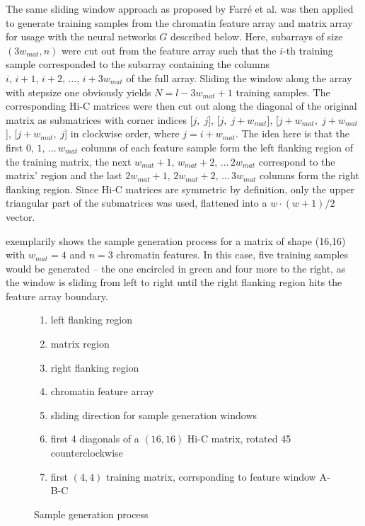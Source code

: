 The same sliding window approach as proposed by Farr\'e et al. \cite{Farre2018a} was then applied to generate training samples 
from the chromatin feature array and matrix array for usage with the neural networks $G$ described below.
Here, subarrays of size $(3w_\mathit{mat}, n)$ were cut out from the feature array 
such that the $i$-th training sample corresponded to the subarray containing the columns $i,\,i+1,\,i+2,\,\dots,\,i+3w_\mathit{mat}$ of the full array. 
Sliding the window along the array with stepsize one obviously yields $N=l-3w_\mathit{mat}+1$ training samples.
The corresponding Hi-C matrices were then cut out along the diagonal of the original matrix 
as submatrices with corner indices [$j,\;j$], [$j,\;j+w_\mathit{mat}$], [$j+w_\mathit{mat},\;j+w_\mathit{mat}$], [$j+w_\mathit{mat},\;j$] in clockwise order, where $j=i+w_\mathit{mat}$.
The idea here is that the first $0,\,1,\,\dots \,w_\mathit{mat}$ columns of each feature sample form the left flanking region of the training matrix, 
the next $w_\mathit{mat}+1,\,w_\mathit{mat}+2,\,\dots \,2w_\mathit{mat}$ correspond to the matrix' region and the last $2w_\mathit{mat}+1,\,2w_\mathit{mat}+2,\,\dots \,3w_\mathit{mat}$ columns form the right flanking region.
Since Hi-C matrices are symmetric by definition, only the upper triangular part of the submatrices was used, 
flattened into a $w\cdot (w+1)/2$ vector.

 exemplarily shows the sample generation process for a matrix of shape (16,16) with $w_\mathit{mat}=4$ and $n=3$ chromatin features.
In this case, five training samples would be generated -- the one encircled in green and four more to the right, as the window is sliding from left to right until the
right flanking region hits the feature array boundary.
\begin{figure}[hbp]
 \begin{minipage}{0.65\textwidth}
    \caption{Sample generation process}
    \label{fig:methods:sample_gen}
 \end{minipage}\hfill
 \begin{minipage}{0.3\textwidth}
 \scriptsize
  \begin{enumerate}[label=\Alph*:,leftmargin=*]
   \raggedright
    \item left flanking region
    \item matrix region
    \item right flanking region
    \item chromatin feature array
    \item sliding direction for sample generation windows
    \item first 4 diagonals of a $(16, 16)$ Hi-C matrix, rotated \SI{45}{\deg} counterclockwise
    \item first $(4, 4)$ training matrix, corrsponding to feature window A-B-C
\end{enumerate}
 \end{minipage}
\end{figure}

